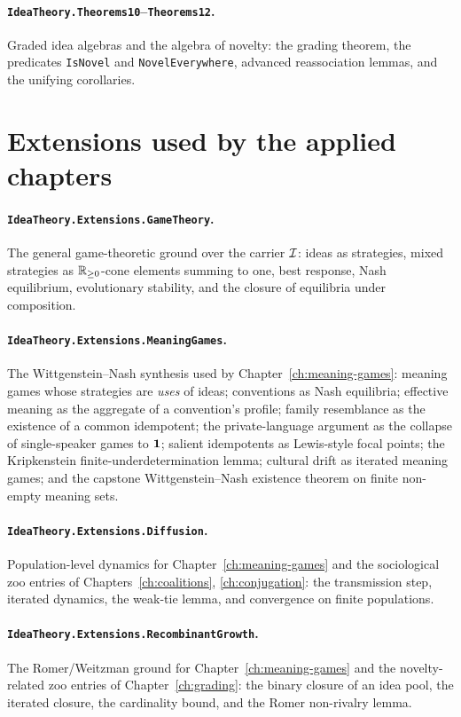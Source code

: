 \paragraph{\texttt{IdeaTheory.Theorems10}--\texttt{Theorems12}.}
Graded idea algebras and the algebra of novelty: the grading theorem,
the predicates \texttt{IsNovel} and \texttt{NovelEverywhere}, advanced
reassociation lemmas, and the unifying corollaries.

\section*{Extensions used by the applied chapters}

\paragraph{\texttt{IdeaTheory.Extensions.GameTheory}.}
The general game-theoretic ground over the carrier $\mathcal{I}$: ideas as
strategies, mixed strategies as $\mathbb{R}_{\geq 0}$-cone elements summing
to one, best response, Nash equilibrium, evolutionary stability, and
the closure of equilibria under composition.

\paragraph{\texttt{IdeaTheory.Extensions.MeaningGames}.}
The Wittgenstein--Nash synthesis used by Chapter~\ref{ch:meaning-games}:
meaning games whose strategies are \emph{uses} of ideas; conventions as
Nash equilibria; effective meaning as the aggregate of a convention's
profile; family resemblance as the existence of a common idempotent;
the private-language argument as the collapse of single-speaker
games to $\mathbf{1}$; salient idempotents as Lewis-style focal points;
the Kripkenstein finite-underdetermination lemma; cultural drift as
iterated meaning games; and the capstone Wittgenstein--Nash existence
theorem on finite non-empty meaning sets.

\paragraph{\texttt{IdeaTheory.Extensions.Diffusion}.}
Population-level dynamics for Chapter~\ref{ch:meaning-games} and the
sociological zoo entries of Chapters~\ref{ch:coalitions},
\ref{ch:conjugation}: the transmission step, iterated dynamics, the
weak-tie lemma, and convergence on finite populations.

\paragraph{\texttt{IdeaTheory.Extensions.RecombinantGrowth}.}
The Romer/Weitzman ground for Chapter~\ref{ch:meaning-games} and the
novelty-related zoo entries of Chapter~\ref{ch:grading}: the binary
closure of an idea pool, the iterated closure, the cardinality bound,
and the Romer non-rivalry lemma.

